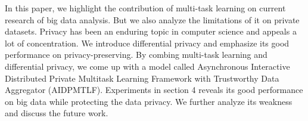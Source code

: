 
In this paper, we highlight the contribution of  multi-task learning on current research of big data analysis. But we also analyze the limitations of it on private datasets. Privacy has been an enduring topic in computer science and appeals a lot of concentration. We introduce differential privacy and emphasize its good performance on privacy-preserving. By combing multi-task learning and differential privacy, we come up with a model called Asynchronous Interactive Distributed Private Multitask Learning Framework with Trustworthy Data Aggregator (AIDPMTLF). Experiments in section 4 reveals its good performance on big data while protecting the data privacy. We further analyze its weakness and discuss the future work.